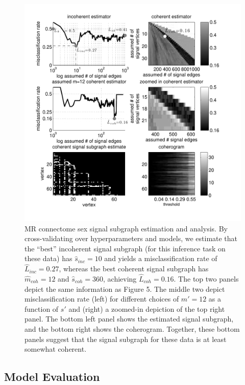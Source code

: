 \documentclass[10pt,journal,cspaper,compsoc]{IEEEtran}
\providecommand{\wh}[1]{\widehat{#1}}
\begin{document}


\begin{figure}[htbp]
	\centering
		\includegraphics[width=1.0\linewidth]{../figs/BLSA0317_Count_Lhats_results.pdf}
	\caption{MR connectome sex signal subgraph estimation and analysis. By cross-validating over hyperparameters and models, we estimate that the ``best'' incoherent signal subgraph (for this inference task on these data) has $\wh{s}_{inc}=10$ and yields a misclassification rate of $\wh{L}_{inc}=0.27$, whereas the best coherent signal subgraph has $\wh{m}_{coh}=12$ and $\wh{s}_{coh}=360$, achieving $\wh{L}_{coh}=0.16$.  The top two panels depict the same information as Figure 5.  The middle two depict misclassification rate (left) for different choices of $m'=12$ as a function of $s'$ and (right) a zoomed-in depiction of the top right panel. The bottom left panel shows the estimated signal subgraph, and the bottom right shows the coherogram.  Together, these bottom panels suggest that the signal subgraph for these data is at least somewhat coherent.}
	\label{fig:data}
\end{figure}

\subsection{Model Evaluation} %
\label{sub:model_checking}
\end{document}
